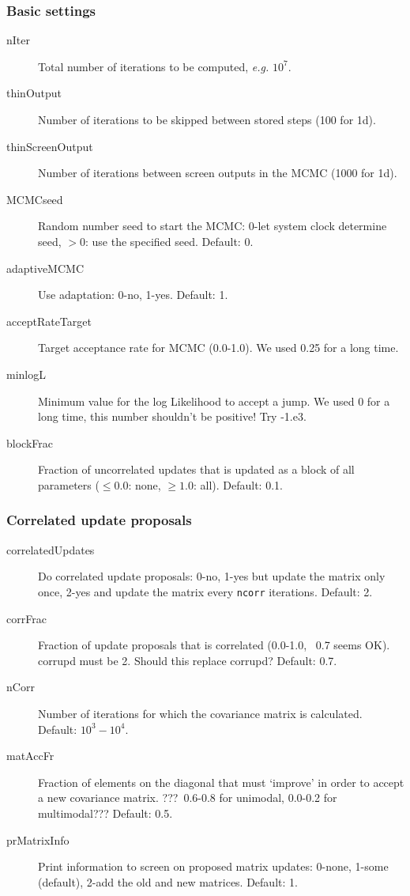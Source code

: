 \subsubsection{Basic settings}
\begin{description}
\item[nIter] Total number of iterations to be computed, \textit{e.g.} $10^7$.
\item[thinOutput] Number of iterations to be skipped between stored steps (100 for 1d).
\item[thinScreenOutput] Number of iterations between screen outputs in the MCMC (1000 for 1d).
\item[MCMCseed] Random number seed to start the MCMC: 0-let system clock determine seed, $>0$: use the specified seed.  Default: 0.
\item[adaptiveMCMC] Use adaptation: 0-no, 1-yes.  Default: 1.
\item[acceptRateTarget] Target acceptance rate for MCMC (0.0-1.0).  We used 0.25 for a long time.
\item[minlogL] Minimum value for the log Likelihood to accept a jump. We used 0 for a long time, this number shouldn't be positive! Try -1.e3.
\item[blockFrac] Fraction of uncorrelated updates that is updated as a block of all parameters ($\leq 0.0$: none, $\geq 1.0$: all).  Default: 0.1.
\end{description}


\subsubsection{Correlated update proposals}
\begin{description}
\item[correlatedUpdates] Do correlated update proposals: 0-no, 1-yes but update the matrix only once, 2-yes and update the matrix every \texttt{ncorr} iterations.  Default: 2.
\item[corrFrac] Fraction of update proposals that is correlated (0.0-1.0, ~0.7 seems OK). corrupd must be 2. Should this replace corrupd?  Default: 0.7.
\item[nCorr] Number of iterations for which the covariance matrix is calculated.  Default: $10^3-10^4$.
\item[matAccFr] Fraction of elements on the diagonal that must `improve' in order to accept a new covariance matrix. ???~0.6-0.8 for unimodal, 0.0-0.2 for multimodal???  Default: 0.5.
\item[prMatrixInfo] Print information to screen on proposed matrix updates: 0-none, 1-some (default), 2-add the old and new matrices.  Default: 1.
\end{description}

